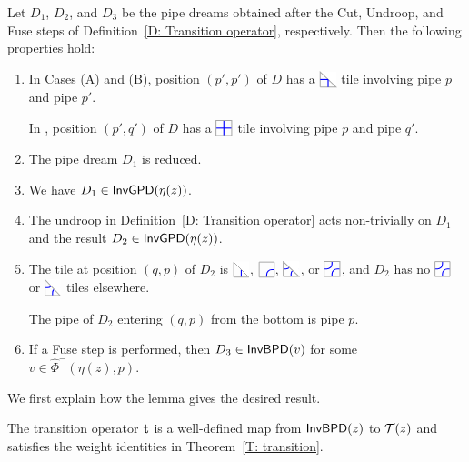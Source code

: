 \documentclass[10pt]{article}
\begin{document}
\begin{lemma}
\label{L: t well-defined}
Let $D_1$, $D_2$, and $D_3$ be the pipe dreams obtained after the Cut,
Undroop, and Fuse steps of Definition~\ref{D: Transition operator}, respectively.
Then the following properties hold:
\begin{enumerate}
\item[(1)] In Cases (A) and (B), position $(p',p')$ of $D$ has a $\PDIAG$ tile
involving pipe $p$ and pipe $p'$.

In \CaseC, position $(p',q')$ of $D$ has a $\PTILE$ tile involving pipe $p$
and pipe $q'$.

\item[(2)] The pipe dream $D_1$ is reduced.

\item[(3)] We have $D_1\in\mathsf{InvGPD}(\eta(z))$.

\item[(4)] The undroop in Definition~\ref{D: Transition operator} acts non-trivially
on $D_1$ and the result $D_2\in\mathsf{InvGPD}(\eta(z))$.

\item[(5)] The tile at position $(q,p)$ of $D_2$ is  $\CDIAG$, $\CTILE$,
$\EDIAG$, or $\ETILE$, and $D_2$ has no $\ETILE$ or $\EDIAG$ tiles elsewhere.

The pipe of $D_2$ entering $(q,p)$ from the bottom is pipe $p$.

\item[(6)] If a Fuse step is performed, then $D_3\in\mathsf{InvBPD}(v)$ for some
$v\in\hat\Phi^{-}(\eta(z),p)$.
\end{enumerate}
\end{lemma}

We first explain how the lemma gives the desired result.

\begin{proposition}
\label{P: forward transition well defined}
The transition operator $\mathbf t$ is a well-defined map from
$\mathsf{InvBPD}(z)$ to $\mathcal{T}(z)$ and satisfies the weight identities
in Theorem~\ref{T: transition}.
\end{proposition}
\end{document}

